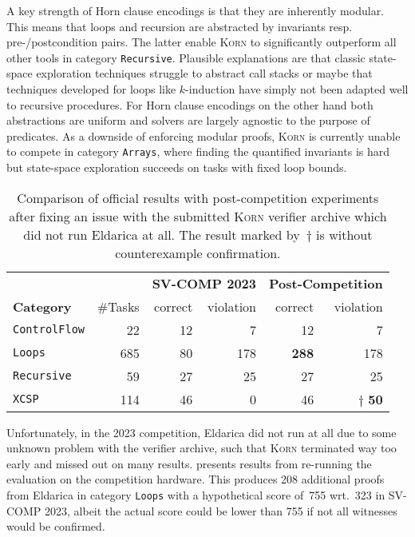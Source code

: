 \documentclass{llncs}
\newcommand{\Korn}{\textsc{Korn}\xspace}
\begin{document}
A key strength of Horn clause encodings is that they are inherently modular.
This means that loops and recursion are
abstracted by invariants resp. pre-/postcondition pairs.
The latter enable \Korn to significantly outperform all other tools in category \texttt{Recursive}.
Plausible explanations are that classic state-space exploration techniques
struggle to abstract call stacks or maybe that techniques developed for loops
like $k$-induction have simply not been adapted well to recursive procedures.
For Horn clause encodings on the other hand
both abstractions are uniform and solvers are largely agnostic to the purpose of predicates.
As a downside of enforcing modular proofs,
\Korn is currently unable to compete in category \texttt{Arrays},
where finding the quantified invariants is hard but state-space exploration succeeds
on tasks with fixed loop bounds.

\begin{table}[t]
    \setlength{\tabcolsep}{6pt}
    \centering
    \caption{Comparison of official results
           with post-competition experiments after fixing
           an issue with the submitted \Korn verifier archive
           which did not run Eldarica at all.
           The result marked by~$\dagger$ is without counterexample confirmation. }
    \label{fig:results}
     \begin{tabular}{lrrrrr}
     \toprule
     &&
     \multicolumn{2}{c}{\textbf{SV-COMP 2023}} &
     \multicolumn{2}{c}{\textbf{Post-Competition}}
     \\
     \cmidrule(lr){3-4}
     \cmidrule(l){5-6}
     \multicolumn{1}{l}{\textbf{Category}} &
     \#Tasks &
     correct & violation &
     correct & violation \\
     \cmidrule(r){1-1}
     \cmidrule(lr){2-2}
     \cmidrule(lr){3-3}
     \cmidrule(lr){4-4}
     \cmidrule(lr){5-5}
     \cmidrule(l){6-6}
     \texttt{ControlFlow}   &     22     &    12 &     7 &    12 &     7 \\
     \texttt{Loops}         &    685     &    80 &   178 &\bf288 &   178 \\
     \texttt{Recursive}     &     59     &    27 &    25 &    27 &    25 \\
     \texttt{XCSP}          &    114     &    46 &     0 &    46 &$\dagger$ \bf 50 \\
     \bottomrule
     \end{tabular}
\end{table}


Unfortunately, in the 2023 competition,
Eldarica did not run at all due to some unknown problem with the verifier archive,
such that \Korn terminated way too early and missed out on many results.
 presents results from re-running the evaluation on the competition hardware.
This produces 208 additional proofs from Eldarica
in category \texttt{Loops} with a hypothetical score of~755
wrt.~323 in SV-COMP 2023, albeit the actual score could be lower than 755 if not all witnesses would be confirmed.
\end{document}
